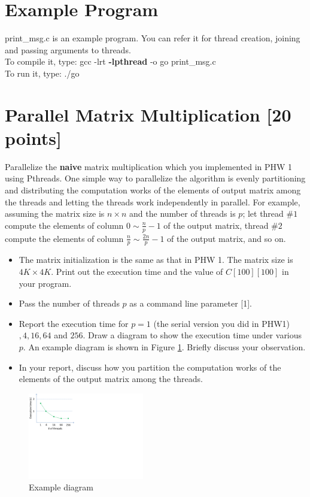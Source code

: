 \documentclass[times, 12pt]{article}
\begin{document}
\section*{Example Program}
print\_msg.c is an example program. You can refer it for thread creation, joining and passing arguments to threads.\\
To compile it, type: gcc -lrt \textbf{-lpthread} -o go print\_msg.c\\
To run it, type: ./go

\section{Parallel Matrix Multiplication [20 points]}
Parallelize the \textbf{naive} matrix multiplication which you implemented in PHW 1 using Pthreads. One simple way to parallelize the algorithm is evenly partitioning and distributing the computation works of the elements of output matrix among the threads and letting the threads work independently in parallel. For example, assuming the matrix size is $n\times n$ and the number of threads is $p$; let thread $\#1$ compute the elements of column $0 \sim \frac{n}{p}-1$ of the output matrix, thread $\#2$ compute the elements of column $\frac{n}{p} \sim \frac{2n}{p}-1$ of the output matrix, and so on. 

\begin{itemize}
\item The matrix initialization is the same as that in PHW 1. The matrix size is $4K \times 4K$. Print out the execution time and the value of $C[100][100]$ in your program.
\item Pass the number of threads $p$ as a command line parameter [1].
\item Report the execution time for $p=1$ (the serial version you did in PHW1)$,4 ,16, 64$ and $256$. Draw a diagram to show the execution time under various $p$. An example diagram is shown in Figure \ref{fig1}. Briefly discuss your observation.
\item In your report, discuss how you partition the computation works of the elements of the output matrix among the threads.
\end{itemize}

\begin{figure}[hbtp]
 \includegraphics[width=0.45\textwidth,keepaspectratio]{diagram.pdf}
 \centering 
 \caption{Example diagram}	 
 \label{fig1}
\end{figure} 
\end{document}
